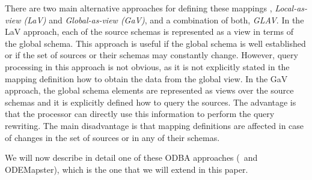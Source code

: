 There are two main alternative approaches for defining these mappings \cite{Lenzerini_02}, \textit{Local-as-view (LaV)}
and \textit{Global-as-view \linebreak (GaV)}, and a combination of both, \textit{GLAV}. In the LaV approach, each of the source
schemas is represented as a view in terms of the global schema.
This approach is useful if the global schema is well established or if the set of sources or their schemas may constantly change.
However, query processing in this approach is not obvious, as it is not explicitly stated in the mapping definition how
to obtain the data from the global view.
In the GaV approach, the global schema elements are represented as views over the source schemas and it is explicitly defined how to query the sources. The advantage is that the processor can directly use this information to perform the query rewriting. The main disadvantage is that mapping definitions are affected in case of changes in the set of sources or in any of their schemas.  %

We will now describe in detail one of these ODBA \linebreak approaches (\rtwoo\ and ODEMapster), which is the one that we will
extend in this paper.


